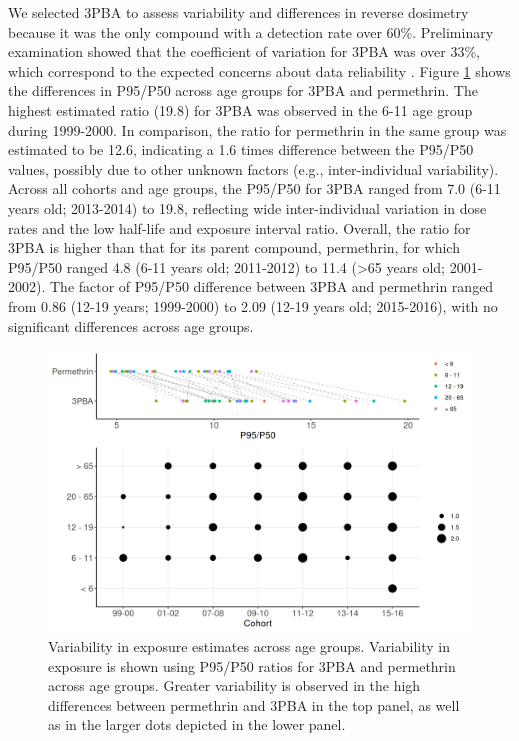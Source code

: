\documentclass[toxics,article,submit,pdftex,moreauthors]{Definitions/mdpi}
\begin{document}
We selected 3PBA to assess variability and differences in reverse
dosimetry because it was the only compound with a detection rate over
60\%. Preliminary examination showed that the coefficient of variation
for 3PBA was over 33\%, which correspond to the expected concerns about
data reliability \citep{faure_evaluation_2020}. Figure \ref{fig:fig5}
shows the differences in P95/P50 across age groups for 3PBA and
permethrin. The highest estimated ratio (19.8) for 3PBA was observed in
the 6-11 age group during 1999-2000. In comparison, the ratio for
permethrin in the same group was estimated to be 12.6, indicating a
1.6 times difference between the P95/P50 values, possibly due to other
unknown factors (e.g., inter-individual variability). Across all cohorts
and age groups, the P95/P50 for 3PBA ranged from 7.0 (6-11 years old;
2013-2014) to 19.8, reflecting wide inter-individual variation in dose
rates and the low half-life and exposure interval ratio. Overall, the
ratio for 3PBA is higher than that for its parent compound, permethrin,
for which P95/P50 ranged 4.8 (6-11 years old; 2011-2012) to 11.4 (\textgreater65
years old; 2001-2002). The factor of P95/P50 difference between 3PBA and
permethrin ranged from 0.86 (12-19 years; 1999-2000) to 2.09
(12-19 years old; 2015-2016), with no significant differences across age
groups.

\begin{figure}[H]
\centering
\begin{adjustwidth}{-2cm}{}
\centering
\includegraphics[width=1\linewidth,]{figures/fig5_variability} 
\hfill
\end{adjustwidth}
\caption{Variability in exposure estimates across age groups. 
Variability in exposure is shown using P95/P50 ratios for 3PBA and permethrin across age groups. 
Greater variability is observed in the high differences between permethrin and 3PBA in the top panel, 
as well as in the larger dots depicted in the lower panel.}\label{fig:fig5}
\end{figure}
\end{document}
